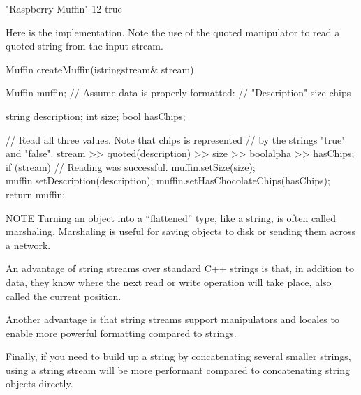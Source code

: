 \begin{shell}
"Raspberry Muffin" 12 true
\end{shell}

Here is the implementation. Note the use of the quoted manipulator to read a quoted string from the input stream.

\begin{cpp}
Muffin createMuffin(istringstream& stream)
{
    Muffin muffin;
    // Assume data is properly formatted:
    // "Description" size chips

    string description;
    int size;
    bool hasChips;

    // Read all three values. Note that chips is represented
    // by the strings "true" and "false".
    stream >> quoted(description) >> size >> boolalpha >> hasChips;
    if (stream) { // Reading was successful.
        muffin.setSize(size);
        muffin.setDescription(description);
        muffin.setHasChocolateChips(hasChips);
    }
    return muffin;
}
\end{cpp}

\begin{myNotic}{NOTE}
Turning an object into a “flattened” type, like a string, is often called marshaling. Marshaling is useful for saving objects to disk or sending them across a network.
\end{myNotic}

An advantage of string streams over standard C++ strings is that, in addition to data, they know where the next read or write operation will take place, also called the current position.

Another advantage is that string streams support manipulators and locales to enable more powerful formatting compared to strings.

Finally, if you need to build up a string by concatenating several smaller strings, using a string stream will be more performant compared to concatenating string objects directly.
